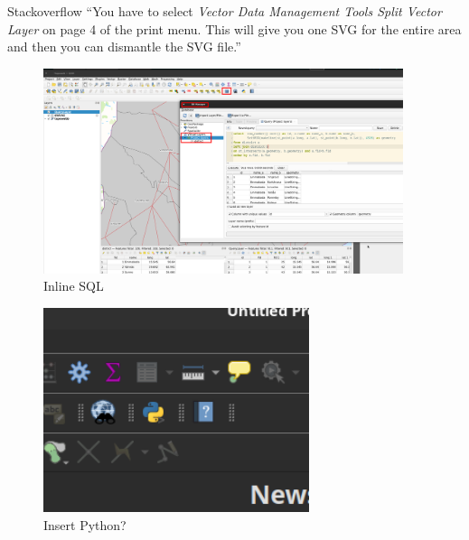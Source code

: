 \begin{frame}
    \begin{block}{Stackoverflow}
        \enquote{You have to select \textit{Vector Data Management Tools Split Vector Layer} on page 4 of the print menu. This will give you one SVG for the entire area and then you can dismantle the SVG file.}
    \end{block}
\end{frame}



\begin{frame}
    \begin{figure}
        \centering
        \includegraphics[height = 6cm]{images/qgis_sql.png}%
        \caption{Inline SQL}
    \end{figure}
\end{frame}

\begin{frame}
    \begin{figure}
        \centering
        \includegraphics[height = 6cm]{images/qgis_python.png}%
        \caption{Insert Python?}
    \end{figure}
\end{frame}

